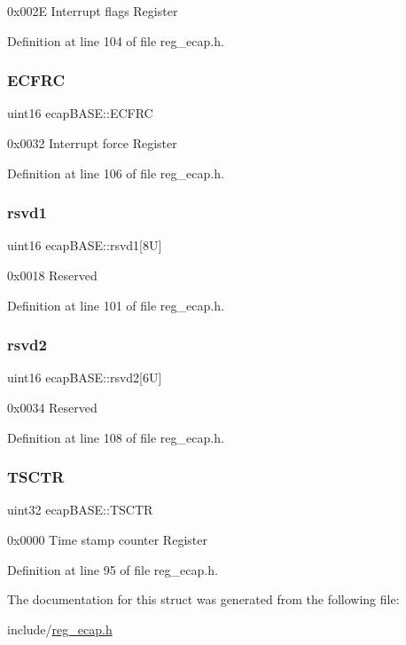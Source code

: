 0x002E Interrupt flags Register 

Definition at line 104 of file reg\+\_\+ecap.\+h.

\mbox{\label{structecapBASE_a0e89e6b9dc28759e72c90ac27d232f68}} 
\subsubsection{\texorpdfstring{E\+C\+F\+RC}{ECFRC}}
{\footnotesize\ttfamily uint16 ecap\+B\+A\+S\+E\+::\+E\+C\+F\+RC}

0x0032 Interrupt force Register 

Definition at line 106 of file reg\+\_\+ecap.\+h.

\mbox{\label{structecapBASE_ae082d4b14e1e70d3549b55c86716d724}} 
\subsubsection{\texorpdfstring{rsvd1}{rsvd1}}
{\footnotesize\ttfamily uint16 ecap\+B\+A\+S\+E\+::rsvd1\mbox{[}8\+U\mbox{]}}

0x0018 Reserved 

Definition at line 101 of file reg\+\_\+ecap.\+h.

\mbox{\label{structecapBASE_a2587e08a0ce761a5b5112a6f0c37fc3c}} 
\subsubsection{\texorpdfstring{rsvd2}{rsvd2}}
{\footnotesize\ttfamily uint16 ecap\+B\+A\+S\+E\+::rsvd2\mbox{[}6\+U\mbox{]}}

0x0034 Reserved 

Definition at line 108 of file reg\+\_\+ecap.\+h.

\mbox{\label{structecapBASE_af4dec4a7fa08794456ac2c4616c96176}} 
\subsubsection{\texorpdfstring{T\+S\+C\+TR}{TSCTR}}
{\footnotesize\ttfamily uint32 ecap\+B\+A\+S\+E\+::\+T\+S\+C\+TR}

0x0000 Time stamp counter Register 

Definition at line 95 of file reg\+\_\+ecap.\+h.



The documentation for this struct was generated from the following file\+:\begin{DoxyCompactItemize}
\item 
include/\mbox{\hyperlink{reg__ecap_8h}{reg\+\_\+ecap.\+h}}\end{DoxyCompactItemize}
